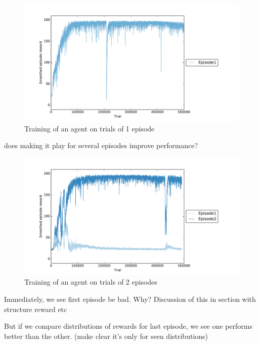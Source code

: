 \begin{figure}
	\centering
	\includegraphics[width=0.9\linewidth]{fig/20perms1ep_training.pdf}
	\caption{Training of an agent on trials of 1 episode}
	\label{fig:20perms1ep_training}
\end{figure}

does making it play for several episodes improve performance?

\begin{figure}
	\centering
	\includegraphics[width=0.9\linewidth]{fig/20perms2ep_training.pdf}
	\caption{Training of an agent on trials of 2 episodes}
	\label{fig:20perms1ep_training}
\end{figure}

Immediately, we see first episode be bad. Why? Discussion of this in section
with structure reward etc

But if we compare distributions of rewards for last episode, we see one 
performs better than the other. (make clear it's only for seen distributions)

